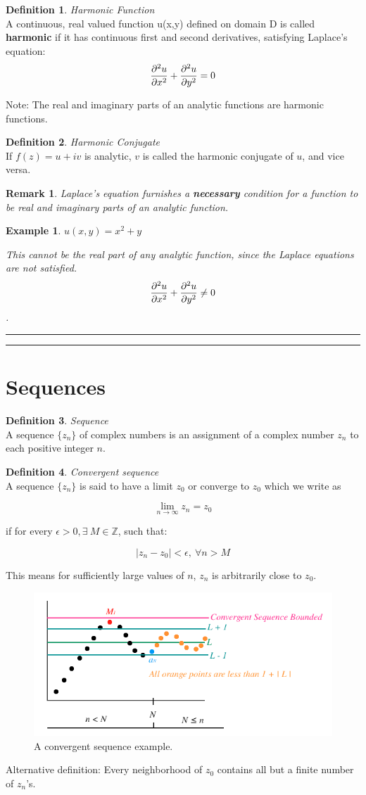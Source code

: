 \documentclass{article}
\newtheorem{ex}{Example}
\newtheorem*{remark}{Remark}
\theoremstyle{definition}
\newtheorem{definition}{Definition}[section]
\newcommand{\Section}[1]{\hrule\hrule\section{#1}}
\newcommand{\Def}[2]{
\begin{shaded*}
\begin{definition}{\textit{#1}}\\#2\end{definition}
\end{shaded*}
}
\begin{document}
\Def{Harmonic Function}{ A continuous, real valued function u(x,y) defined on domain D is called \textbf{harmonic} if it has continuous first and second derivatives, satisfying Laplace's equation:
$$\pdv{^2u}{x^2} + \pdv{^2u}{y^2} = 0$$ 

Note: The real and imaginary parts of an analytic functions are harmonic functions.}

\Def{Harmonic Conjugate}{If $f(z) = u + iv$ is analytic, $v$ is called the harmonic conjugate of $u$, and vice versa.}

\begin{remark}
Laplace's equation furnishes a \textbf{necessary} condition for a function to be real and imaginary parts of an analytic function.
\end{remark}

\begin{ex}
$u(x,y) = x^2+y$

This cannot be the real part of any analytic function, since the Laplace equations are not satisfied. $$\pdv{^2u}{x^2} + \pdv{^2u}{y^2} \neq 0 $$.
\end{ex}

\Section{Sequences}
\Def{Sequence}{ A sequence $\{z_n\}$ of complex numbers is an assignment of a complex number $z_n$ to each positive integer $n$.}

\Def{Convergent sequence}{A sequence $\{z_n\}$ is said to have a limit $z_0$ or converge to $z_0$ which we write as 

$$\lim_{n\to\infty} z_n = z_0$$

if for every $\epsilon > 0, \exists\ M \in  \mathbb{Z}$, such that:

$$|z_n - z_0| < \epsilon,\ \forall n > M$$

This means for sufficiently large values of $n$, $z_n$ is arbitrarily close to $z_0$.

\begin{figure}[H]
	\centering
	\includegraphics[width=0.7\linewidth]{convseq}
	\caption{A convergent sequence example. }
	\label{fig:convseq}
\end{figure}

Alternative definition: Every neighborhood of $z_0$ contains all but a finite number of $z_n$'s.
}
\end{document}
